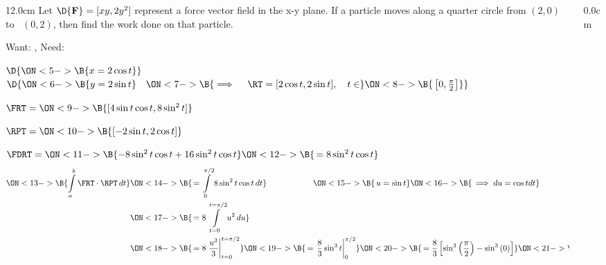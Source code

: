 \begin{frame}
\frametitle{}
\scriptsize
\begin{columns}\begin{column}{12.0cm}
\EX Let $\D{\bf F} = [xy,2y^2]$ represent a force vector field in the x-y plane.  If a particle moves along a quarter circle from $(2,0)$ \, to \, $(0,2)$, then find the work done on that particle.

Want: 
, \quad Need: 

\vspace{0.2cm}


\vspace{0.2cm}

$\D{
\ON<5->{\B{x = 2\cos t}}}$\\
$\D{
\ON<6->{\B{y = 2\sin t}} \quad 
\ON<7->{\B{\implies \quad \RT = [2\cos t, 2\sin t], \quad t \in }}
\ON<8->{\B{\, \left[0, \frac{\pi}{2}\right]}} } $\\

\vspace{0.2cm}

$\FRT = 
\ON<9->{\B{[4\sin t\cos t,8\sin^2 t]}}$
	
\vspace{0.2cm}
	
$\RPT = 
\ON<10->{\B{[-2\sin t, 2\cos t]}}$
	
\vspace{0.2cm}
	
$\FDRT = 
\ON<11->{\B{-8\sin^2 t\cos t + 16\sin^2 t\cos t}} 
\ON<12->{\B{\, = 8\sin^2 t\cos t}}$
\begin{align*}
	\ON<13->{\B{\int \limits_{a}^{b} \FRT \cdot \RPT \, dt}}  
		& \ON<14->{\B{\, = \int \limits_{0}^{\pi/2} 8\sin^2 t\cos t \, dt}} \hspace{2.0cm}
		\ON<15->{\B{\, u=\sin t}} 
		\ON<16->{\B{\, \implies du=\cos t dt}} \\
		& \ON<17->{\B{\, = 8\int \limits_{t=0}^{t=\pi/2} u^2 \, du}}\\
		& \ON<18->{\B{\, = 8\left.\frac{u^3}{3}\right|_{t=0}^{t=\pi/2}}}
		  \ON<19->{\B{\, = \left.\frac{8}{3}\sin^3t\right|_{0}^{\pi/2}}}
		  \ON<20->{\B{\, = \frac{8}{3}\left[\sin^3\left(\frac{\pi}{2}\right) - \sin^3\left(0\right)\right]}}
		  \ON<21->{\B{\, = \frac{8}{3}}}  \\
\end{align*}

\vspace{9.6cm}

\end{column}\begin{column}{0.0cm}\end{column}\end{columns}
\end{frame}


